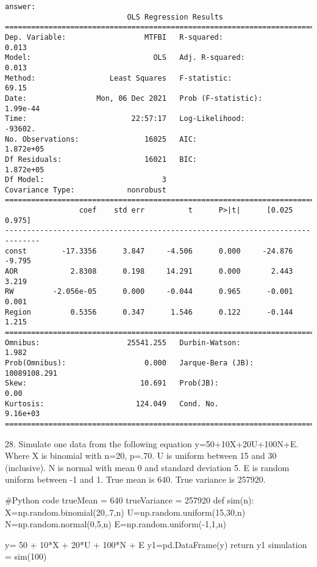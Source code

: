 \documentclass{article}
\begin{document}
\begin{verbatim}
answer: 
                            OLS Regression Results
==============================================================================
Dep. Variable:                  MTFBI   R-squared:                       0.013
Model:                            OLS   Adj. R-squared:                  0.013
Method:                 Least Squares   F-statistic:                     69.15
Date:                Mon, 06 Dec 2021   Prob (F-statistic):           1.99e-44
Time:                        22:57:17   Log-Likelihood:                -93602.
No. Observations:               16025   AIC:                         1.872e+05
Df Residuals:                   16021   BIC:                         1.872e+05
Df Model:                           3
Covariance Type:            nonrobust
==============================================================================
                 coef    std err          t      P>|t|      [0.025      0.975]
------------------------------------------------------------------------------
const        -17.3356      3.847     -4.506      0.000     -24.876      -9.795
AOR            2.8308      0.198     14.291      0.000       2.443       3.219
RW         -2.056e-05      0.000     -0.044      0.965      -0.001       0.001
Region         0.5356      0.347      1.546      0.122      -0.144       1.215
==============================================================================
Omnibus:                    25541.255   Durbin-Watson:                   1.982
Prob(Omnibus):                  0.000   Jarque-Bera (JB):         10089108.291
Skew:                          10.691   Prob(JB):                         0.00
Kurtosis:                     124.049   Cond. No.                     9.16e+03
==============================================================================
\end{verbatim}


28. Simulate one data from the following equation y=50+10X+20U+100N+E.  Where X is binomial with n=20, p=.70. U is uniform between 15 and 30 (inclusive). N is normal with mean 0 and standard deviation 5. E is random uniform between -1 and 1. True mean is 640. True variance is 257920.
\begin{pythoncode}
#Python code
trueMean = 640
trueVariance = 257920
def sim(n):
    X=np.random.binomial(20,.7,n)
    U=np.random.uniform(15,30,n)
    N=np.random.normal(0,5,n)
    E=np.random.uniform(-1,1,n)

    y= 50 + 10*X + 20*U + 100*N + E
    y1=pd.DataFrame(y)
    return y1
simulation = sim(100)
\end{pythoncode}
\end{document}
